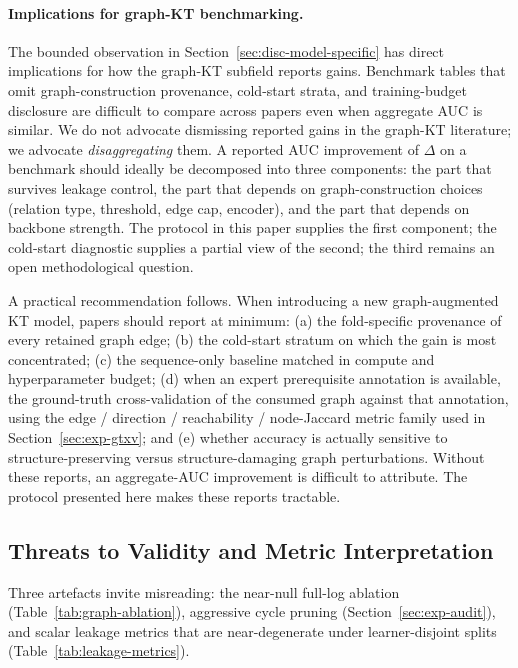 \documentclass[pdflatex,sn-mathphys-num]{sn-jnl}
\begin{document}
\paragraph{Implications for graph-KT benchmarking.}
The bounded observation in Section~\ref{sec:disc-model-specific} has direct
implications for how the graph-KT subfield reports gains. Benchmark tables
that omit graph-construction provenance, cold-start strata, and training-budget
disclosure are difficult to compare across papers even when aggregate AUC is
similar. We do not advocate dismissing reported gains in the graph-KT
literature; we advocate \emph{disaggregating} them. A reported AUC improvement
of $\Delta$ on a benchmark should ideally be decomposed into three components:
the part that survives leakage control, the part that depends on
graph-construction choices (relation type, threshold, edge cap, encoder), and
the part that depends on backbone strength. The protocol in this paper supplies
the first component; the cold-start diagnostic supplies a partial view of the
second; the third remains an open methodological question.

A practical recommendation follows. When introducing a new
graph-augmented KT model, papers should report at minimum: (a) the
fold-specific provenance of every retained graph edge; (b) the
cold-start stratum on which the gain is most concentrated; (c) the
sequence-only baseline matched in compute and hyperparameter budget;
(d) when an expert prerequisite annotation is available, the
ground-truth cross-validation of the consumed graph against that
annotation, using the edge / direction / reachability / node-Jaccard
metric family used in Section~\ref{sec:exp-gtxv}; and (e) whether
accuracy is actually sensitive to structure-preserving versus
structure-damaging graph perturbations. Without these reports, an
aggregate-AUC improvement is difficult to attribute. The protocol
presented here makes these reports tractable.

\subsection{Threats to Validity and Metric Interpretation}
\label{sec:threats-validity}
Three artefacts invite misreading: the near-null full-log ablation
(Table~\ref{tab:graph-ablation}), aggressive cycle pruning
(Section~\ref{sec:exp-audit}), and scalar leakage metrics that are near-degenerate under learner-disjoint
splits (Table~\ref{tab:leakage-metrics}).
\end{document}

